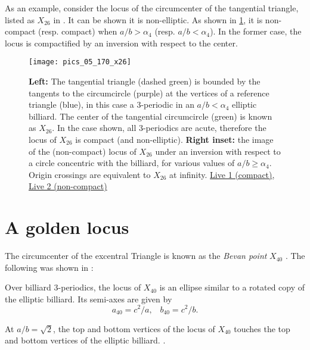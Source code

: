 As an example, consider the locus of the circumcenter of the tangential triangle, listed as $X_{26}$ in \cite{etc}. It can be shown it is non-elliptic. As shown in \cref{fig:05-locus-x26}, it is non-compact (resp. compact) when $a/b>\alpha_4$ (resp. $a/b<\alpha_4$). In the former case, the locus is compactified by an inversion with respect to the center.

\begin{figure}
    \centering
    \texttt{[image: pics\_05\_170\_x26]}
    \caption{\textbf{Left:} The tangential triangle (dashed green) is bounded by the tangents to the circumcircle (purple)  at the vertices of a reference triangle (blue), in this case a 3-periodic in an $a/b<\alpha_4$ elliptic billiard. The center of the tangential circumcircle (green) is known as $X_{26}$. In the case shown, all 3-periodics are acute, therefore the locus of $X_{26}$ is compact (and non-elliptic). \textbf{Right inset:} the image of the (non-compact) locus of $X_{26}$ under an inversion with respect to a circle concentric with the billiard, for various values of $a/b{\geq}\alpha_4$. Origin crossings are equivalent to $X_{26}$ at infinity. \href{https://bit.ly/3446TYF}{Live 1 (compact)}, \href{https://bit.ly/3hMiTpT}{Live 2 (non-compact)}}
    \label{fig:05-locus-x26}
\end{figure}


\section{A golden locus}
\label{sec:05-golden-locus}

The circumcenter of the excentral Triangle is known as the {\em Bevan point} $X_{40}$ \cite{etc}. The following was shown in \cite{garcia2020-ellipses}:

\begin{proposition}
Over billiard 3-periodics, the locus of $X_{40}$ is an ellipse similar to a rotated copy of the elliptic billiard. Its semi-axes are given by 
%
\begin{equation*}
    a_{40}=c^2/a,\;\;\; b_{40}=c^2/b.
\end{equation*}
\end{proposition}

\begin{corollary}
At $a/b=\sqrt{2}$, the top and bottom vertices of the locus of $X_{40}$ touches the top and bottom vertices of the elliptic billiard.
\label{cor:05-x40-tangent}.
\end{corollary}

